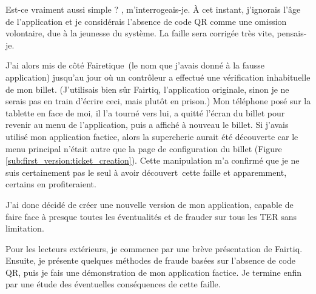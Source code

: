 \documentclass[a4paper]{article}
\begin{document}
\og Est-ce vraiment aussi simple ? \fg, m'interrogeais-je.
À cet instant, j'ignorais l'âge de l'application et je considérais l'absence de code QR
comme une omission volontaire, due à la jeunesse du système. \og La faille sera corrigée très vite\fg, pensais-je.


J'ai alors mis de côté \og Fairetique\fg\ (le nom que j'avais donné à la fausse application) jusqu'au jour où un
contrôleur a effectué une vérification inhabituelle de mon billet. (J'utilisais bien sûr Fairtiq,
l'application originale, sinon je ne serais pas en train d'écrire ceci, mais plutôt en prison.)
Mon téléphone posé sur la tablette en face de moi,  il l'a tourné vers lui, a quitté l'écran
du billet pour revenir au menu de l'application, puis a affiché à nouveau le billet.
Si j'avais utilisé mon application factice, alors
la supercherie aurait été découverte car le menu principal n'était autre que la page de configuration
du billet (Figure \ref*{sub:first_version:ticket_creation}).
Cette manipulation m'a confirmé que je ne suis certainement pas le seul à avoir \og découvert\fg\ cette faille et apparemment, certains en profiteraient.


J'ai donc décidé de créer une nouvelle version de mon application,
capable de faire face à presque toutes les éventualités et de frauder
sur tous les TER sans limitation.

Pour les lecteurs extérieurs, je commence par une brève présentation de Fairtiq.
Ensuite, je présente quelques méthodes de fraude basées sur l'absence de code QR,
puis je fais une démonstration de mon application factice. Je termine enfin par
une étude des éventuelles conséquences de cette faille.
\clearpage





\begin{center}
  \setlength{\fboxsep}{10pt}
  \vspace*{\fill}

  \vspace*{\fill}
\end{center}
\end{document}
